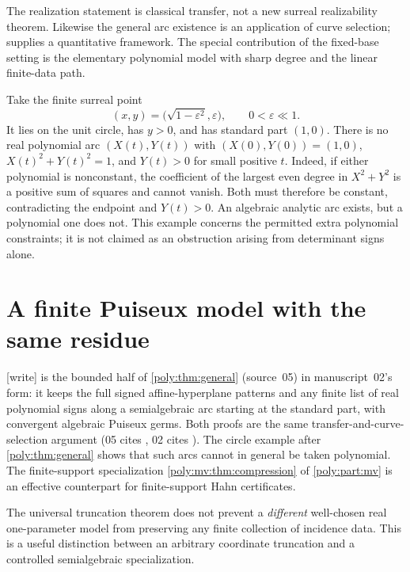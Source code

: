 \documentclass[11pt,a4paper]{article}
\numberwithin{equation}{section}
\theoremstyle{plain}
\newcommand{\wtag}{\textup{[write]}}%
\newcommand{\eps}{\varepsilon}
\begin{document}
The realization statement is classical transfer, not a new surreal
realizability theorem. Likewise the general arc existence is an application
of curve selection; \cite{fs:BR} supplies a quantitative framework. The
special contribution of the fixed-base setting is the elementary
polynomial model with sharp degree and the linear finite-data path.

\begin{example}
Take the finite surreal point
\[
 (x,y)=\bigl(\sqrt{1-\eps^2},\eps\bigr),\qquad 0<\eps\ll1.
\]
It lies on the unit circle, has $y>0$, and has standard part $(1,0)$.
There is no real polynomial arc $(X(t),Y(t))$ with
$(X(0),Y(0))=(1,0)$, $X(t)^2+Y(t)^2=1$, and $Y(t)>0$ for small positive
$t$. Indeed, if either polynomial is nonconstant, the coefficient of the
largest even degree in $X^2+Y^2$ is a positive sum of squares and cannot
vanish. Both must therefore be constant, contradicting the endpoint and
$Y(t)>0$. An algebraic analytic arc exists, but a polynomial one does not.
This example concerns the permitted extra polynomial constraints; it is
not claimed as an obstruction arising from determinant signs alone.
\end{example}

\section{A finite Puiseux model with the same residue}\label{poly:ts:sec:puiseux}
\noindent\wtag{}  is the bounded half of
\cref{poly:thm:general} (source~05) in manuscript~02's form: it keeps the
full signed affine-hyperplane patterns and any finite list of real polynomial
signs along a semialgebraic arc starting at the standard part, with
convergent algebraic Puiseux germs. Both proofs are the same
transfer-and-curve-selection argument (05 cites
\cite{fs:BPR,fs:BR}, 02 cites \cite{ts:BCR,fs:BR}). The circle example after
\cref{poly:thm:general} shows that such arcs cannot in general be taken
polynomial. The finite-support specialization \cref{poly:mv:thm:compression}
of \cref{poly:part:mv} is an effective counterpart for finite-support
Hahn certificates.

The universal truncation theorem does not prevent a \emph{different}
well-chosen real one-parameter model from preserving any finite collection
of incidence data. This is a useful distinction between an arbitrary
coordinate truncation and a controlled semialgebraic specialization.
\end{document}
